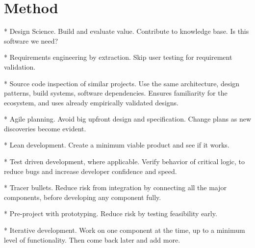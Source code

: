 \chapter{Method}\label{chap:method}




* Design Science. Build and evaluate value. Contribute to knowledge base. Is this software we need?

* Requirements engineering by extraction. Skip user testing for requirement validation. 

* Source code inspection of similar projects. Use the same architecture, design patterns, build systems, software dependencies. Ensures familiarity for the ecosystem, and uses already empirically validated designs.

* Agile planning. Avoid big upfront design and specification. Change plans as new discoveries become evident.

* Lean development. Create a minimum viable product and see if it works.

* Test driven development, where applicable. Verify behavior of critical logic, to reduce bugs and increase developer confidence and speed.

* Tracer bullets. Reduce risk from integration by connecting all the major components, before developing any component fully.

* Pre-project with prototyping. Reduce risk by testing feasibility early.

* Iterative development. Work on one component at the time, up to a minimum level of functionality. Then come back later and add more.
